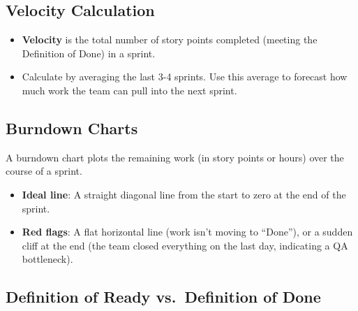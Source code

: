 \subsection{Velocity Calculation}\label{velocity-calculation}

\begin{itemize}
\tightlist
\item
  \textbf{Velocity} is the total number of story points completed
  (meeting the Definition of Done) in a sprint.
\item
  Calculate by averaging the last 3-4 sprints. Use this average to
  forecast how much work the team can pull into the next sprint.
\end{itemize}

\subsection{Burndown Charts}\label{burndown-charts}

A burndown chart plots the remaining work (in story points or hours)
over the course of a sprint.

\begin{itemize}
\tightlist
\item
  \textbf{Ideal line}: A straight diagonal line from the start to zero
  at the end of the sprint.
\item
  \textbf{Red flags}: A flat horizontal line (work isn't moving to
  ``Done''), or a sudden cliff at the end (the team closed everything on
  the last day, indicating a QA bottleneck).
\end{itemize}

\subsection{Definition of Ready vs.~Definition of
Done}\label{definition-of-ready-vs.-definition-of-done}

